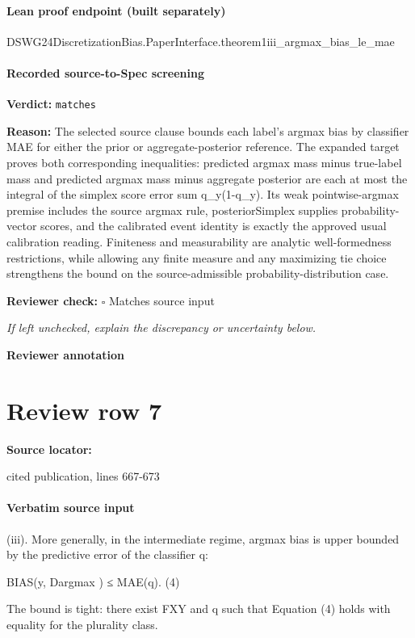 \documentclass[10pt]{article}
\newcommand{\reviewerbox}{%
  \par\noindent\fbox{\parbox{0.96\linewidth}{\rule{0pt}{0.38in}}}\par
}
\newcommand{\reviewmatch}[1]{%
  \par\noindent\textbf{Reviewer check:} $\square$\; #1\par
  \noindent\emph{If left unchecked, explain the discrepancy or uncertainty below.}\par
}
\begin{document}
\paragraph{Lean proof endpoint (built separately)}\begin{ReviewVerbatim}
DSWG24DiscretizationBias.PaperInterface.theorem1iii_argmax_bias_le_mae
\end{ReviewVerbatim}

\paragraph{Recorded source-to-Spec screening}
\textbf{Verdict:} \texttt{matches}
\\
{\raggedright
\textbf{Reason:} The selected source clause bounds each label's argmax bias by classifier MAE for either the prior or aggregate-\allowbreak{}posterior reference.\allowbreak{} The expanded target proves both corresponding inequalities:\allowbreak{} predicted argmax mass minus true-\allowbreak{}label mass and predicted argmax mass minus aggregate posterior are each at most the integral of the simplex score error sum q\_\allowbreak{}y(1-\allowbreak{}q\_\allowbreak{}y).\allowbreak{} Its weak pointwise-\allowbreak{}argmax premise includes the source argmax rule, posteriorSimplex supplies probability-\allowbreak{}vector scores, and the calibrated event identity is exactly the approved usual calibration reading.\allowbreak{} Finiteness and measurability are analytic well-\allowbreak{}formedness restrictions, while allowing any finite measure and any maximizing tie choice strengthens the bound on the source-\allowbreak{}admissible probability-\allowbreak{}distribution case.\allowbreak{}
\par}
\reviewmatch{Matches source input}
\noindent\textbf{Reviewer annotation}\par
\reviewerbox
\clearpage
\hypertarget{source-claim-d6b9878258465151}{}
\section*{Review row 7}
\textbf{Source locator:} {\footnotesize\raggedright cited publication, lines 667-\allowbreak{}673\par}
\paragraph{Verbatim source input}
\begin{ReviewVerbatim}
(iii). More generally, in the intermediate regime, argmax bias is upper bounded by the predictive error of
        the classifier q:

                                                                                                   BIAS(y, Dargmax ) ≤ MAE(q).                                                         (4)

       The bound is tight: there exist FXY and q such that Equation (4) holds with equality for the plurality
       class.
\end{ReviewVerbatim}
\end{document}
